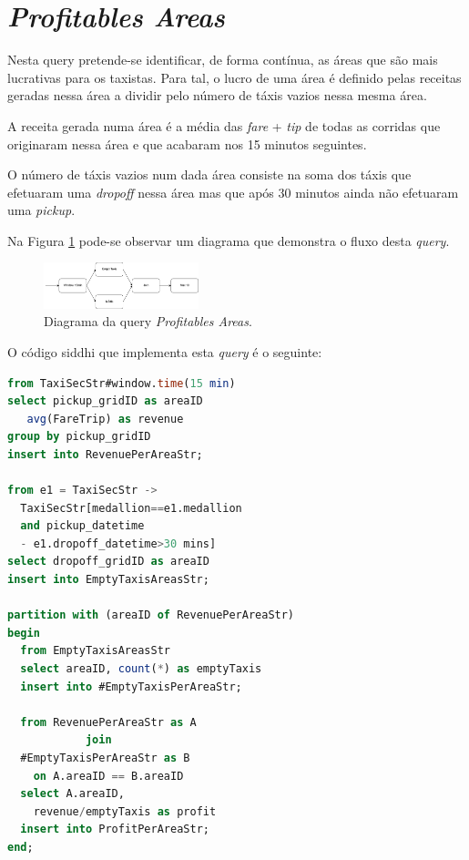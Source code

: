 \documentclass[article]{IEEEtran}
\begin{document}
\section{\textit{Profitables Areas}}

Nesta query pretende-se identificar, de forma contínua, as áreas que são mais lucrativas para os taxistas. Para tal, o lucro de uma área é definido pelas receitas geradas nessa área a dividir pelo número de táxis vazios nessa mesma área.

A receita gerada numa área é a média das \textit{fare} + \textit{tip} de todas as corridas que originaram nessa área e que acabaram nos 15 minutos seguintes.

O número de táxis vazios num dada área consiste na soma dos táxis que efetuaram uma \textit{dropoff} nessa área mas que após 30 minutos ainda não efetuaram uma \textit{pickup}.

Na Figura \ref{fig:profitablesAreasDiagram} pode-se observar um diagrama que demonstra o fluxo desta \textit{query}.

\begin{figure}[hbtp]
    \centering
        \includegraphics[width=0.4\textwidth]{images/profitableAreasDiagram}
    \caption{Diagrama da query \textit{Profitables Areas}.}
    \label{fig:profitablesAreasDiagram}
\end{figure}

O código siddhi que implementa esta \textit{query} é o seguinte:

\begin{lstlisting}[language=SQL]
from TaxiSecStr#window.time(15 min)
select pickup_gridID as areaID
   avg(FareTrip) as revenue
group by pickup_gridID
insert into RevenuePerAreaStr;

from e1 = TaxiSecStr ->
  TaxiSecStr[medallion==e1.medallion 
  and pickup_datetime 
  - e1.dropoff_datetime>30 mins]
select dropoff_gridID as areaID
insert into EmptyTaxisAreasStr;

partition with (areaID of RevenuePerAreaStr)
begin
  from EmptyTaxisAreasStr
  select areaID, count(*) as emptyTaxis
  insert into #EmptyTaxisPerAreaStr;

  from RevenuePerAreaStr as A 
            join
  #EmptyTaxisPerAreaStr as B 
    on A.areaID == B.areaID
  select A.areaID,
    revenue/emptyTaxis as profit
  insert into ProfitPerAreaStr;
end;
\end{lstlisting}
\end{document}
